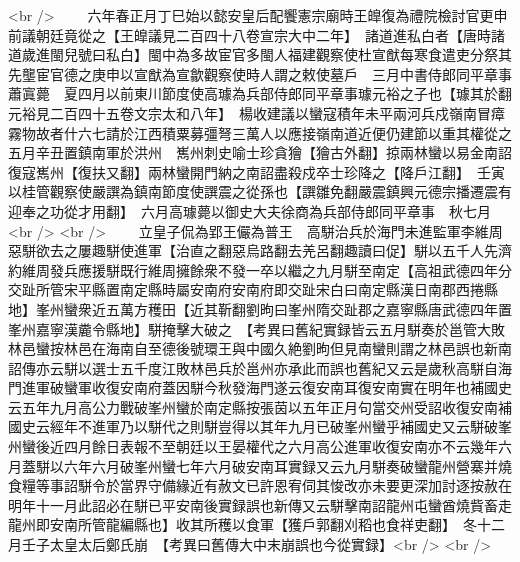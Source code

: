 <br />
　　六年春正月丁巳始以懿安皇后配饗憲宗廟時王皥復為禮院檢討官更申前議朝廷竟從之【王皥議見二百四十八卷宣宗大中二年】　諸道進私白者【唐時諸道歲進閩兒號曰私白】閩中為多故宦官多閩人福建觀察使杜宣猷每寒食遣吏分祭其先壟宦官德之庚申以宣猷為宣歙觀察使時人謂之敕使墓戶　三月中書侍郎同平章事蕭寘薨　夏四月以前東川節度使高璩為兵部侍郎同平章事璩元裕之子也【璩其於翻元裕見二百四十五卷文宗太和八年】　楊收建議以蠻寇積年未平兩河兵戍嶺南冒瘴霧物故者什六七請於江西積粟募彊弩三萬人以應接嶺南道近便仍建節以重其權從之五月辛丑置鎮南軍於洪州　嶲州刺史喻士珍貪獪【獪古外翻】掠兩林蠻以易金南詔復寇嶲州【復扶又翻】兩林蠻開門納之南詔盡殺戍卒士珍降之【降戶江翻】　壬寅以桂管觀察使嚴譔為鎮南節度使譔震之從孫也【譔雛免翻嚴震鎮興元德宗播遷震有迎奉之功從才用翻】　六月高璩薨以御史大夫徐商為兵部侍郎同平章事　秋七月<br />
<br />
　　立皇子侃為郢王儼為普王　高駢治兵於海門未進監軍李維周惡駢欲去之屢趣駢使進軍【治直之翻惡烏路翻去羌呂翻趣讀曰促】駢以五千人先濟約維周發兵應援駢既行維周擁餘衆不發一卒以繼之九月駢至南定【高祖武德四年分交趾所管宋平縣置南定縣時屬安南府安南府即交趾宋白曰南定縣漢日南郡西捲縣地】峯州蠻衆近五萬方穫田【近其靳翻劉昫曰峯州隋交趾郡之嘉寧縣唐武德四年置峯州嘉寧漢麊令縣地】駢掩擊大破之　【考異曰舊紀實録皆云五月駢奏於邕管大敗林邑蠻按林邑在海南自至德後號環王與中國久絶劉昫但見南蠻則謂之林邑誤也新南詔傳亦云駢以選士五千度江敗林邑兵於邕州亦承此而誤也舊紀又云是歲秋高駢自海門進軍破蠻軍收復安南府蓋因駢今秋發海門遂云復安南耳復安南實在明年也補國史云五年九月高公力戰破峯州蠻於南定縣按張茵以五年正月句當交州受詔收復安南補國史云經年不進軍乃以駢代之則駢豈得以其年九月已破峯州蠻乎補國史又云駢破峯州蠻後近四月餘日表報不至朝廷以王晏權代之六月高公進軍收復安南亦不云幾年六月蓋駢以六年六月破峯州蠻七年六月破安南耳實録又云九月駢奏破蠻龍州營寨并燒食糧等事詔駢令於當界守備緣近有赦文已許恩宥伺其悛改亦未要更深加討逐按赦在明年十一月此詔必在駢已平安南後實録誤也新傳又云駢擊南詔龍州屯蠻酋燒貲畜走龍州即安南所管龍編縣也】收其所穫以食軍【獲戶郭翻刈稻也食祥吏翻】　冬十二月壬子太皇太后鄭氏崩　【考異曰舊傳大中末崩誤也今從實録】<br />
<br />
